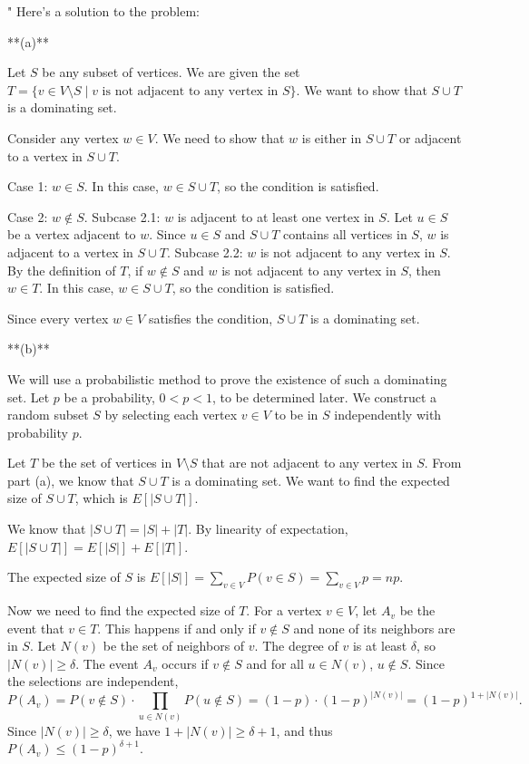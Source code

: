 \begin{enumerate}
\begin{shaded}
"
Here's a solution to the problem:

**(a)**

Let $S$ be any subset of vertices. We are given the set $T = \{v \in V \setminus S \mid v \text{ is not adjacent to any vertex in } S\}$. We want to show that $S \cup T$ is a dominating set.

Consider any vertex $w \in V$. We need to show that $w$ is either in $S \cup T$ or adjacent to a vertex in $S \cup T$.

Case 1: $w \in S$. In this case, $w \in S \cup T$, so the condition is satisfied.

Case 2: $w \notin S$.
   Subcase 2.1: $w$ is adjacent to at least one vertex in $S$. Let $u \in S$ be a vertex adjacent to $w$. Since $u \in S$ and $S \cup T$ contains all vertices in $S$, $w$ is adjacent to a vertex in $S \cup T$.
   Subcase 2.2: $w$ is not adjacent to any vertex in $S$. By the definition of $T$, if $w \notin S$ and $w$ is not adjacent to any vertex in $S$, then $w \in T$. In this case, $w \in S \cup T$, so the condition is satisfied.

Since every vertex $w \in V$ satisfies the condition, $S \cup T$ is a dominating set.

**(b)**

We will use a probabilistic method to prove the existence of such a dominating set. Let $p$ be a probability, $0 < p < 1$, to be determined later. We construct a random subset $S$ by selecting each vertex $v \in V$ to be in $S$ independently with probability $p$.

Let $T$ be the set of vertices in $V \setminus S$ that are not adjacent to any vertex in $S$. From part (a), we know that $S \cup T$ is a dominating set. We want to find the expected size of $S \cup T$, which is $E[|S \cup T|]$.

We know that $|S \cup T| = |S| + |T|$. By linearity of expectation, $E[|S \cup T|] = E[|S|] + E[|T|]$.

The expected size of $S$ is $E[|S|] = \sum_{v \in V} P(v \in S) = \sum_{v \in V} p = np$.

Now we need to find the expected size of $T$. For a vertex $v \in V$, let $A_v$ be the event that $v \in T$. This happens if and only if $v \notin S$ and none of its neighbors are in $S$. Let $N(v)$ be the set of neighbors of $v$. The degree of $v$ is at least $\delta$, so $|N(v)| \ge \delta$. The event $A_v$ occurs if $v \notin S$ and for all $u \in N(v)$, $u \notin S$. Since the selections are independent,
$$P(A_v) = P(v \notin S) \cdot \prod_{u \in N(v)} P(u \notin S) = (1-p) \cdot (1-p)^{|N(v)|} = (1-p)^{1 + |N(v)|}.$$
Since $|N(v)| \ge \delta$, we have $1 + |N(v)| \ge \delta + 1$, and thus $P(A_v) \le (1-p)^{\delta+1}$.


\end{shaded}
\end{enumerate}
